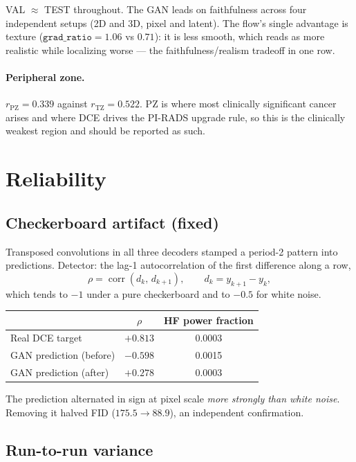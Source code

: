 \documentclass[11pt]{article}
\newcommand{\1}{\mathbb{1}}
\begin{document}
VAL $\approx$ TEST throughout. The GAN leads on faithfulness across four independent setups
(2D and 3D, pixel and latent). The flow's single advantage is texture
($\texttt{grad\_ratio}=1.06$ vs $0.71$): it is less smooth, which reads as more realistic
while localizing worse --- the faithfulness/realism tradeoff in one row.

\paragraph{Peripheral zone.} $r_{\text{PZ}}=0.339$ against $r_{\text{TZ}}=0.522$. PZ is
where most clinically significant cancer arises and where DCE drives the PI-RADS upgrade
rule, so this is the clinically weakest region and should be reported as such.

\section{Reliability}

\subsection{Checkerboard artifact (fixed)}

Transposed convolutions in all three decoders stamped a period-2 pattern into predictions.
Detector: the lag-1 autocorrelation of the first difference along a row,
\begin{equation}
\rho=\operatorname{corr}(d_k,\,d_{k+1}),\qquad d_k=y_{k+1}-y_k ,
\end{equation}
which tends to $-1$ under a pure checkerboard and to $-0.5$ for white noise.

\begin{center}
\begin{tabular}{lcc}
\toprule
& $\rho$ & HF power fraction \\
\midrule
Real DCE target & $+0.813$ & 0.0003 \\
GAN prediction (before) & $\mathbf{-0.598}$ & 0.0015 \\
GAN prediction (after) & $+0.278$ & 0.0003 \\
\bottomrule
\end{tabular}
\end{center}

The prediction alternated in sign at pixel scale \emph{more strongly than white noise}.
Removing it halved FID ($175.5\to88.9$), an independent confirmation.

\subsection{Run-to-run variance}
\end{document}
